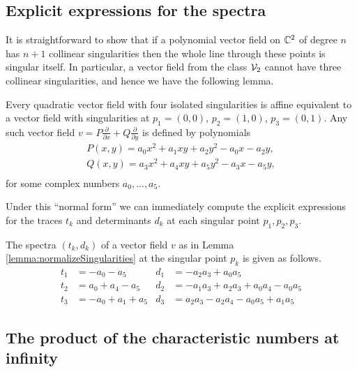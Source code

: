 \documentclass[phd,tocprelim]{cornell}
\begin{document}
\subsection{Explicit expressions for the spectra}

\begin{remark}
It is straightforward to show that if a polynomial vector field on $\mathbb{C}^2$ of degree $n$ has $n+1$ collinear singularities then the whole line through these points is singular itself. In particular, a vector field from the class $\mathcal{V}_2$ cannot have three collinear singularities, and hence we have the following lemma.
\end{remark}


\begin{lemma}\label{lemma:normalizeSingularities}
 Every quadratic vector field with four isolated singularities is affine equivalent to a vector field with singularities at $p_1=(0,0)$, $p_2=(1,0)$, $p_3=(0,1)$. Any such vector field $v=P\frac{\partial}{\partial x}+Q\frac{\partial}{\partial y}$ is defined by polynomials
\begin{equation}\label{eq:coefficients}
\begin{array}{l} 
 P(x,y) = a_0x^2+a_1xy+a_2y^2-a_0x-a_2y,  \\ 
 Q(x,y) = a_3x^2+a_4xy+a_5y^2-a_3x-a_5y, \\
\end{array}
\end{equation}
for some complex numbers $a_0,\ldots,a_5$.
\end{lemma}

Under this ``normal form'' we can immediately compute the explicit expressions for the traces $t_k$ and determinants $d_k$ at each singular point $p_1,p_2,p_3$.

\begin{lemma}\label{lemma:expressionsSpectra}
 The spectra $(t_k,d_k)$ of a vector field $v$ as in Lemma \ref{lemma:normalizeSingularities} at the singular point $p_k$ is given as follows.
 \begin{align*}
  t_1 &= -a_0-a_5  	& d_1 &= -a_2a_3+a_0a_5 \\
  t_2 &= a_0+a_4-a_5  	& d_2 &= -a_1a_3+a_2a_3+a_0a_4-a_0a_5 \\
  t_3 &= -a_0+a_1+a_5  	& d_3 &= a_2a_3-a_2a_4-a_0a_5+a_1a_5 
 \end{align*}
\end{lemma}


\subsection{The product of the characteristic numbers at infinity}
\end{document}
